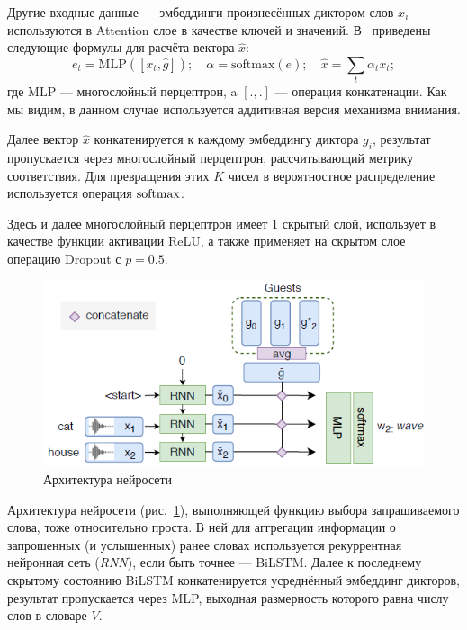 Другие входные данные --- эмбеддинги произнесённых диктором слов $x_i$ ---
используются в Attention слое в качестве ключей и значений. В~\citeisr{}
приведены следующие формулы для расчёта вектора $\hat{x}$:
\begin{equation*}
    e_t = \text{MLP}([x_t, \hat{g}]); \quad \alpha = \text{softmax}(e); \quad
    \hat{x} = \sum_t{\alpha_t x_t};
\end{equation*}
где $\text{MLP}$ --- многослойный перцептрон, a $[.,.]$ --- операция
конкатенации. Как мы видим, в данном случае используется аддитивная версия
механизма внимания.

Далее вектор $\hat{x}$ конкатенируется к каждому эмбеддингу диктора $g_i$,
результат пропускается через многослойный перцептрон, рассчитывающий метрику
соответствия. Для превращения этих $K$ чисел в вероятностное распределение
используется операция $\operatorname{\text{softmax}}$.

Здесь и далее многослойный перцептрон имеет 1 скрытый слой, использует в
качестве функции активации ReLU, а также применяет на скрытом слое операцию
Dropout с $p=0.5$.

\begin{figure}[hbt]
    \centering
    \includegraphics[scale=1.0]{figures/enquirer.png}
    \caption{Архитектура нейросети \enquirer{}~\citeisr}
    \label{fig:enquirer}
\end{figure}

Архитектура нейросети \enquirer{} (рис.~\ref{fig:enquirer}), выполняющей
функцию выбора запрашиваемого слова, тоже относительно проста. В ней для
аггрегации информации о запрошенных (и услышенных) ранее словах используется
рекуррентная нейронная сеть (\textit{RNN}), если быть точнее --- BiLSTM\@.
Далее к последнему скрытому состоянию BiLSTM конкатенируется усреднённый
эмбеддинг дикторов, результат пропускается через MLP, выходная размерность
которого равна числу слов в словаре $V$.

